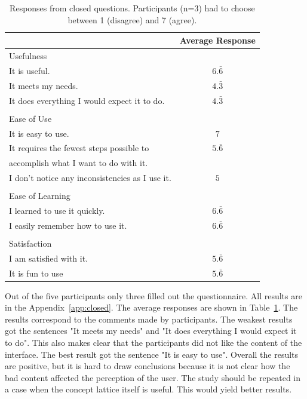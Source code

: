 \documentclass[11pt]{report}
\begin{document}
\begin{table}[h]
\caption{Responses from closed questions. Participants (n=3) had to choose between 1 (disagree) and 7 (agree). }
\label{table:closed}
\centering

\def\arraystretch{1.2}%
\begin{tabular}{ | l | c |}
\hline
& Average Response\\
\hline
\large{Usefulness}&\\
It is useful.&$6.\bar{6}$\\
It meets my needs.&$4.\bar{3}$\\
It does everything I would expect it to do.&$4.\bar{3}$\\
&\\
\large{Ease of Use}&\\
It is easy to use.&$7$\\
It requires the fewest steps possible to&$5.\bar{6}$\\
accomplish what I want to do with it.&\\
I don't notice any inconsistencies as I use it.&$5$\\
&\\
\large{Ease of Learning}&\\
I learned to use it quickly.&$6.\bar{6}$\\
I easily remember how to use it.&$6.\bar{6}$\\
&\\
\large{Satisfaction}&\\
I am satisfied with it.&$5.\bar{6}$\\
It is fun to use&$5.\bar{6}$\\

\hline

\end{tabular}
\end{table}

Out of the five participants only three filled out the questionnaire. All results are in the Appendix~\ref{app:closed}. The average responses are shown in Table~\ref{table:closed}. The results correspond to the comments made by participants. The weakest results got the sentences "It meets my needs" and "It does everything I would expect it to do". This also makes clear that the participants did not like the content of the interface. The best result got the sentence "It is easy to use". Overall the results are positive, but it is hard to draw conclusions because it is not clear how the bad content affected the perception of the user. The study should be repeated in a case when the concept lattice itself is useful. This would yield better results.
\end{document}
